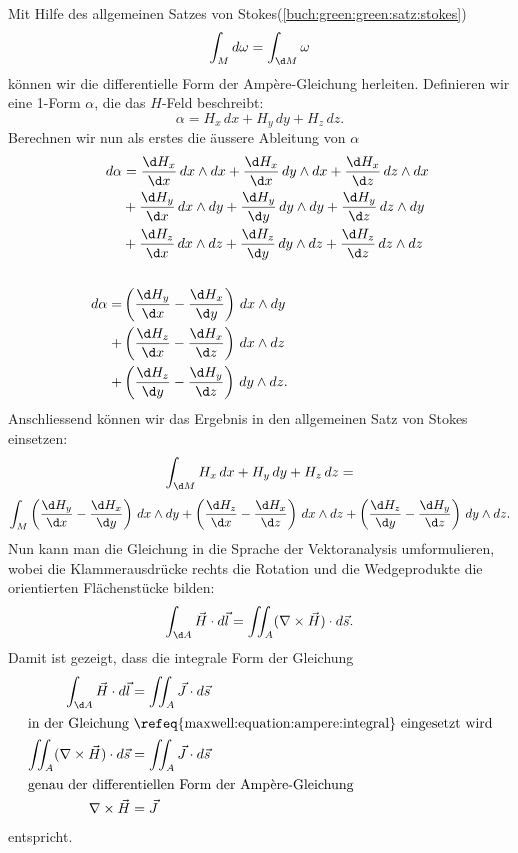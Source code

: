 Mit Hilfe des allgemeinen Satzes von Stokes(\ref{buch:green:green:satz:stokes})
\[
\int_{M} d\omega
=
\int_{\d M} \omega
\]
können wir die differentielle Form der Ampère-Gleichung herleiten.
Definieren wir eine 1-Form $\alpha$, die das $H$-Feld beschreibt:
\[
\alpha
=
H_x \, dx + H_y \, dy + H_z \, dz . 
\]
Berechnen wir nun als erstes die äussere Ableitung von $\alpha$
\begin{align*}
	d\alpha 
	&=
	\frac{\d H_x}{\d x} \, dx \wedge dx + \frac{\d H_x}{\d x} \, dy \wedge dx + \frac{\d H_x}{\d z} \, dz \wedge dx
	\\
	&+
	\frac{\d H_y}{\d x} \, dx \wedge dy + \frac{\d H_y}{\d y} \, dy \wedge dy + \frac{\d H_y}{\d z} \, dz \wedge dy
	\\
	&+
	\frac{\d H_z}{\d x} \, dx \wedge dz + \frac{\d H_z}{\d y} \, dy \wedge dz + \frac{\d H_z}{\d z} \, dz \wedge dz
	\\
	\\
	d\alpha
	=
	&\left(\frac{\d H_y}{\d x} - \frac{\d H_x}{\d y}\right) \, dx \wedge dy
	\\
	+
	&\left(\frac{\d H_z}{\d x} - \frac{\d H_x}{\d z}\right) \, dx \wedge dz
	\\
	+
	&\left(\frac{\d H_z}{\d y} - \frac{\d H_y}{\d z}\right) \, dy \wedge dz .
\end{align*}
Anschliessend können wir das Ergebnis in den allgemeinen Satz von Stokes einsetzen:
\[
\int_{\d M} H_x \, dx + H_y \, dy + H_z \, dz
=
\]
\[
\int_{M} \left(\frac{\d H_y}{\d x} - \frac{\d H_x}{\d y}\right) \, dx \wedge dy
+
\left(\frac{\d H_z}{\d x} - \frac{\d H_x}{\d z}\right) \, dx \wedge dz
+
\left(\frac{\d H_z}{\d y} - \frac{\d H_y}{\d z}\right) \, dy \wedge dz .
\]
Nun kann man die Gleichung in die Sprache der Vektoranalysis umformulieren, wobei die Klammerausdrücke rechts die Rotation und die Wedgeprodukte die orientierten Flächenstücke bilden: 
\begin{equation}
\label{maxwell:equation:ampere:integral}
\int_{\d A} \vec{H} \cdot d\vec{l}
=
\iint_{A} (\nabla \times \vec{H}) \cdot d\vec{s} .
\end{equation}
Damit ist gezeigt, dass die integrale Form der Gleichung
\begin{align}
	\int_{\d A}
	\vec{H} \cdot d\vec{l}
	&=
	\iint_{A}
	\vec{J} \cdot d\vec{s}
	\notag
	\\
	\intertext{in der Gleichung \refeq{maxwell:equation:ampere:integral} eingesetzt wird}
	\iint_{A}
	(
	\nabla \times \vec{H}
	)
	\cdot
	d\vec{s}
	&=
	\iint_{A}
	\vec{J} \cdot d\vec{s}
	\label{maxwell:equation:ampere:differential}
	\\
	\intertext{genau der differentiellen Form der Ampère-Gleichung}
	\nabla \times \vec{H}
	&=
	\vec{J} 
\end{align}
entspricht.

